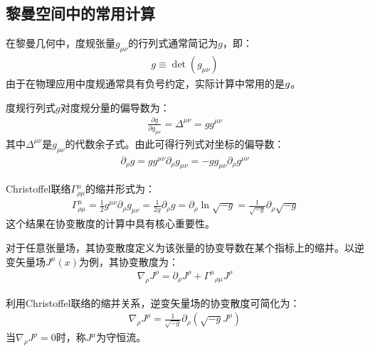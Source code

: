 \subsection{黎曼空间中的常用计算}

在黎曼几何中，度规张量$g_{\mu\nu}$的行列式通常简记为$g$，即：
\begin{align}
g \equiv \det(g_{\mu\nu})
\end{align}
由于在物理应用中度规通常具有负号约定，实际计算中常用的是$\-g$。



\begin{theorem}[度规行列式的导数]
度规行列式$g$对度规分量的偏导数为：
\begin{align}
\frac{\partial g}{\partial g_{\mu\nu}} = \Delta^{\mu\nu} = g g^{\mu\nu}
\end{align}
其中$\Delta^{\mu\nu}$是$g_{\mu\nu}$的代数余子式。由此可得行列式对坐标的偏导数：
\begin{align}
\partial_\rho g = g g^{\mu\nu} \partial_\rho g_{\mu\nu} = -g g_{\mu\nu} \partial_\rho g^{\mu\nu}
\end{align}
\end{theorem}
\begin{theorem}[Christoffel联络的缩并]
Christoffel联络$\Gamma^\mu_{\rho\mu}$的缩并形式为：
\begin{align}
\Gamma^\mu_{\rho\mu} = \frac{1}{2} g^{\mu\nu} \partial_\rho g_{\mu\nu} = \frac{1}{2g} \partial_\rho g = \partial_\rho \ln\sqrt{-g} = \frac{1}{\sqrt{-g}} \partial_\rho \sqrt{-g}
\end{align}
这个结果在协变散度的计算中具有核心重要性。
\end{theorem}

\begin{definition}[协变散度]
对于任意张量场，其协变散度定义为该张量的协变导数在某个指标上的缩并。以逆变矢量场$J^\mu(x)$为例，其协变散度为：
\begin{align}
\nabla_\rho J^\rho = \partial_\rho J^\rho + \Gamma^\mu{}_{\rho\mu} J^\rho
\end{align}
\end{definition}

\begin{theorem}[矢量场的协变散度简化]
利用Christoffel联络的缩并关系，逆变矢量场的协变散度可简化为：
\begin{align}
\nabla_\rho J^\rho = \frac{1}{\sqrt{-g}} \partial_\rho (\sqrt{-g} J^\rho)
\end{align}
当$\nabla_\rho J^\rho = 0$时，称$J^\mu$为守恒流。
\end{theorem}

